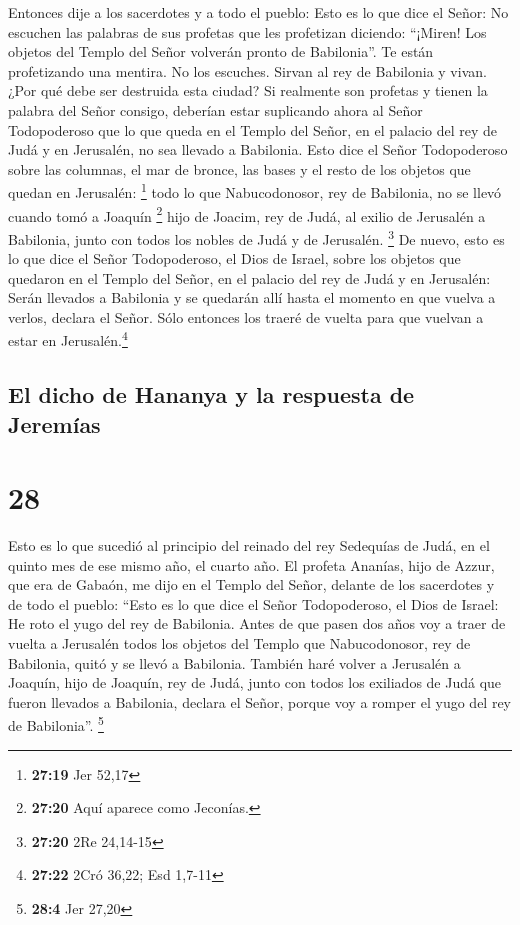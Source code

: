  Entonces dije a los sacerdotes y a todo el pueblo: Esto
es lo que dice el Señor: No escuchen las palabras de sus profetas que
les profetizan diciendo: ``¡Miren! Los objetos del Templo del Señor
volverán pronto de Babilonia''. Te están profetizando una mentira.
 No los escuches. Sirvan al rey de Babilonia y vivan.
¿Por qué debe ser destruida esta ciudad?  Si realmente
son profetas y tienen la palabra del Señor consigo, deberían estar
suplicando ahora al Señor Todopoderoso que lo que queda en el Templo del
Señor, en el palacio del rey de Judá y en Jerusalén, no sea llevado a
Babilonia.  Esto dice el Señor Todopoderoso sobre las
columnas, el mar de bronce, las bases y el resto de los objetos que
quedan en Jerusalén: \footnote{\textbf{27:19} Jer 52,17} 
todo lo que Nabucodonosor, rey de Babilonia, no se llevó cuando tomó a
Joaquín \footnote{\textbf{27:20} Aquí aparece como Jeconías.} hijo de
Joacim, rey de Judá, al exilio de Jerusalén a Babilonia, junto con todos
los nobles de Judá y de Jerusalén. \footnote{\textbf{27:20} 2Re 24,14-15}
 De nuevo, esto es lo que dice el Señor Todopoderoso, el
Dios de Israel, sobre los objetos que quedaron en el Templo del Señor,
en el palacio del rey de Judá y en Jerusalén:  Serán
llevados a Babilonia y se quedarán allí hasta el momento en que vuelva a
verlos, declara el Señor. Sólo entonces los traeré de vuelta para que
vuelvan a estar en Jerusalén.\footnote{\textbf{27:22} 2Cró 36,22; Esd
  1,7-11}

\hypertarget{el-dicho-de-hananya-y-la-respuesta-de-jeremuxedas}{%
\subsection{El dicho de Hananya y la respuesta de
Jeremías}\label{el-dicho-de-hananya-y-la-respuesta-de-jeremuxedas}}

\hypertarget{section-27}{%
\section{28}\label{section-27}}

 Esto es lo que sucedió al principio del reinado del rey
Sedequías de Judá, en el quinto mes de ese mismo año, el cuarto año. El
profeta Ananías, hijo de Azzur, que era de Gabaón, me dijo en el Templo
del Señor, delante de los sacerdotes y de todo el pueblo: 
``Esto es lo que dice el Señor Todopoderoso, el Dios de Israel: He roto
el yugo del rey de Babilonia.  Antes de que pasen dos años
voy a traer de vuelta a Jerusalén todos los objetos del Templo que
Nabucodonosor, rey de Babilonia, quitó y se llevó a Babilonia.
 También haré volver a Jerusalén a Joaquín, hijo de
Joaquín, rey de Judá, junto con todos los exiliados de Judá que fueron
llevados a Babilonia, declara el Señor, porque voy a romper el yugo del
rey de Babilonia''. \footnote{\textbf{28:4} Jer 27,20}

